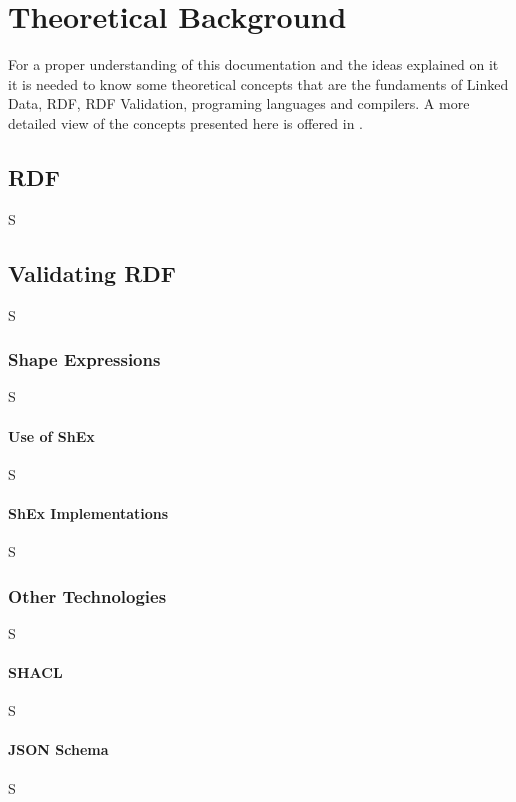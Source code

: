 \setchapterpreamble[u]{\margintoc}
\chapter{Theoretical Background}

For a proper understanding of this documentation and the ideas explained on it it is needed to know some theoretical concepts that are the fundaments of Linked Data, RDF, RDF Validation, programing languages and compilers. A more detailed view of the concepts presented here is offered in .

\section{RDF}
S

\section{Validating RDF}
S

\subsection{Shape Expressions}
S

\subsubsection{Use of ShEx}
S

\subsubsection{ShEx Implementations}
S

\subsection{Other Technologies}
S

\subsubsection{SHACL}
S

\subsubsection{JSON Schema}
S
